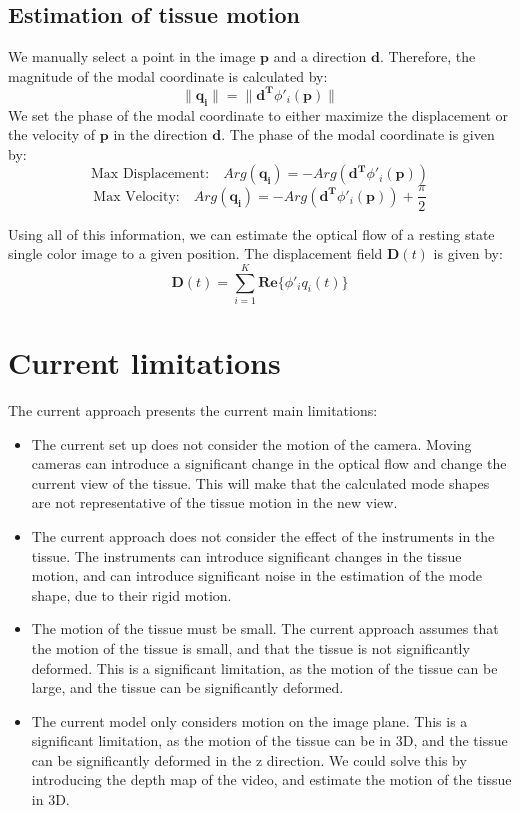 \documentclass{article}
\begin{document}
\subsection*{Estimation of tissue motion}
We manually select a point in the image $\mathbf{p}$ and a direction $\mathbf{d}$. Therefore, the magnitude of the modal coordinate is calculated by:
\begin{equation*}
    \|\mathbf{q_{i}}\| = \|\mathbf{d^{T}}\phi'_{i}(\mathbf{p})\|
\end{equation*}
We set the phase of the modal coordinate to either maximize the displacement or the velocity of $\mathbf{p}$ in the direction $\mathbf{d}$. The phase of the modal coordinate is given by:
\begin{equation*}
    \text{Max Displacement:} \quad Arg(\mathbf{q_{i}}) = -Arg(\mathbf{d^{T}}\phi'_{i}(\mathbf{p}))
\end{equation*}
\begin{equation*}
    \text{Max Velocity:} \quad Arg(\mathbf{q_{i}}) = -Arg(\mathbf{d^{T}}\phi'_{i}(\mathbf{p})) + \frac{\pi}{2}
\end{equation*}

Using all of this information, we can estimate the optical flow of a resting state single color image to a given position. The displacement field $\mathbf{D}(t)$ \cite{chuang_animating_2005} is given by:
\begin{equation*}
    \mathbf{D}(t) = \sum_{i=1}^{K} \mathbf{Re}\{\phi'_{i}q_{i}(t)\}
\end{equation*}

\section*{Current limitations}
The current approach presents the current main limitations:
\begin{itemize}
    \item The current set up does not consider the motion of the camera. Moving cameras can introduce a significant change in the optical flow and change the current view of the tissue. This will make that the calculated mode shapes are not representative of the tissue motion in the new view. 
    \item The current approach does not consider the effect of the instruments in the tissue. The instruments can introduce significant changes in the tissue motion, and can introduce significant noise in the estimation of the mode shape, due to their rigid motion.
    \item The motion of the tissue must be small. The current approach assumes that the motion of the tissue is small, and that the tissue is not significantly deformed. This is a significant limitation, as the motion of the tissue can be large, and the tissue can be significantly deformed.
    \item The current model only considers motion on the image plane. This is a significant limitation, as the motion of the tissue can be in 3D, and the tissue can be significantly deformed in the z direction. We could solve this by introducing the depth map of the video, and estimate the motion of the tissue in 3D.
\end{itemize}
\end{document}
